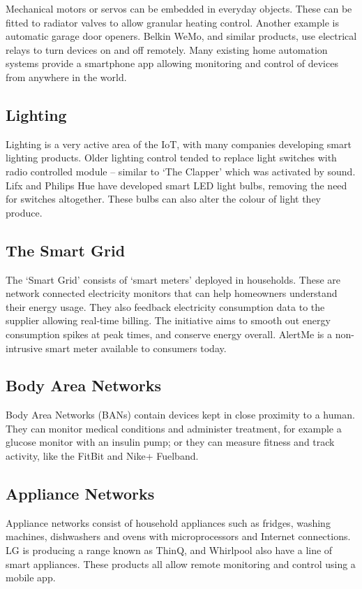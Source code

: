 \documentclass[10pt,journal,compsoc]{IEEEtran}
\begin{document}
Mechanical motors or servos can be embedded in everyday objects. These can be
fitted to radiator valves to allow granular heating control. Another example is
automatic garage door openers. Belkin WeMo, and similar products, use
electrical relays to turn devices on and off remotely. Many existing home
automation systems provide a smartphone app allowing monitoring and control of
devices from anywhere in the world. 

\subsection{Lighting}
Lighting is a very active area of the IoT, with many companies developing smart
lighting products. Older lighting control tended to replace light switches with
radio controlled module -- similar to `The Clapper' which was activated by
sound. Lifx and Philips Hue have developed smart LED light bulbs, removing the
need for switches altogether. These bulbs can also alter the colour of light
they produce.  

\subsection{The Smart Grid}
The `Smart Grid' consists of `smart meters' deployed in households. These are
network connected electricity monitors that can help homeowners understand
their energy usage. They also feedback electricity consumption data to the
supplier allowing real-time billing. The initiative aims to smooth out energy
consumption spikes at peak times, and conserve energy overall.  AlertMe is a
non-intrusive smart meter available to consumers today. 

\subsection{Body Area Networks}
Body Area Networks (BANs) contain devices kept in close proximity to a human.
They can monitor medical conditions and administer treatment, for example a
glucose monitor with an insulin pump; or they can measure fitness and track
activity, like the FitBit and Nike+ Fuelband. 

\subsection{Appliance Networks} 
Appliance networks consist of household appliances such as fridges, washing
machines, dishwashers and ovens with microprocessors and Internet connections.
LG is producing a range known as ThinQ, and Whirlpool also have a line of smart
appliances. These products all allow remote monitoring and control using a
mobile app.
\end{document}
